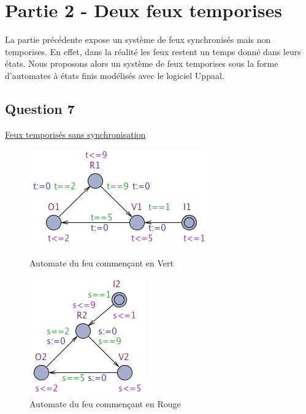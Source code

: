 \documentclass[11pt]{article}
\begin{document}
\newpage
\section{Partie 2 - Deux feux temporises}
La partie précédente expose un système de feux synchronisés mais non temporises. En effet, dans la réalité les feux restent un temps donné dans leurs états. Nous proposons alors un système de feux temporises sous la forme d'automates à états finis modélisés avec le logiciel Uppaal.

\subsection{Question 7}

\href{https://github.com/masters-info-nantes/hong-cheng-lv/blob/master/ressources/part2/Q7-FeuxTemporises.xml}{Feux temporisés sans synchronisation}

\begin{figure}[H]
    \begin{minipage}[c]{.46\linewidth}
		\centering
		\includegraphics[scale=0.5]{ressources/part2/Q7-1.png}
		\caption{Automate du feu commençant en Vert}
    \end{minipage}
    \hfill%
    \begin{minipage}[c]{.46\linewidth}
		\centering
		\includegraphics[scale=0.5]{ressources/part2/Q7-2.png}
		\caption{Automate du feu commençant en Rouge}
    \end{minipage}
\end{figure}
\end{document}
